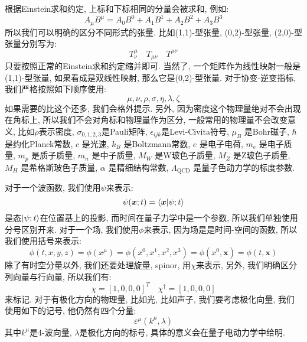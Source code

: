 根据Einstein求和约定, 上标和下标相同的分量会被求和, 例如:
\begin{equation}
  A_\mu B^\mu = A_0 B^0 + A_1 B^1 + A_2 B^2 + A_3 B^3
\end{equation}
所以我们可以明确的区分不同形式的张量.
比如(1,1)-型张量, (0,2)-型张量, (2,0)-型张量分别写为:
\begin{equation}
  T^\mu_\nu \quad T_{\mu\nu} \quad T^{\mu\nu}
\end{equation}
只要按照正常的Einstein求和约定缩并即可.
当然了, 一个矩阵作为线性映射一般是(1,1)-型张量, 如果看成是双线性映射, 那么它是(0,2)-型张量. %
对于协变-逆变指标, 我们严格按照如下顺序使用:
\begin{equation}
  \mu, \nu, \rho, \sigma, \eta, \lambda, \zeta
\end{equation}
如果需要的比这个还多, 我们会格外提示.
另外, 因为密度这个物理量绝对不会出现在角标上, 所以我们不会对角标和物理量作为区分, 一般常用的物理量不会改变意义, 比如$\rho$表示密度, $\sigma_{0,1,2,3}$是Pauli矩阵, $\epsilon_{ijk}$是Levi-Civita符号, $\mu_B$ 是Bohr磁子, $\hbar$ 是约化Planck常数, $c$ 是光速, $k_B$ 是Boltzmann常数, $e$ 是电子电荷, $m_e$ 是电子质量, $m_p$ 是质子质量, $m_n$ 是中子质量, $M_W$ 是W玻色子质量, $M_Z$ 是Z玻色子质量, $M_H$ 是希格斯玻色子质量, $\alpha$ 是精细结构常数, $\Lambda_{\text{QCD}}$ 是量子色动力学的标度参数.


对于一个波函数, 我们使用$\psi$来表示:
\begin{equation}
  \psi(\bm{x}; t) = \braket{\bm{x}}{\psi; t}
\end{equation}
是态$\ket{\psi; t}$在位置基上的投影, 而时间在量子力学中是一个参数, 所以我们单独使用分号区别开来.
对于一个场, 我们使用$\phi$来表示, 因为场是是时间-空间的函数, 所以我们使用括号来表示:
\begin{equation}
  \phi(t, x, y, z) = \phi(x^\mu) = \phi(x^0, x^1, x^2, x^3) = \phi(x^0, \bm{x}) = \phi(t, \bm{x})
\end{equation}
除了有时空分量以外, 我们还要处理旋量, spinor, 用$\chi$来表示, 另外, 我们明确区分列向量与行向量, 所以我们有:
\begin{equation}
  \chi = [1 ,0 ,0 ,0]^T \quad \chi^\dagger = [1 ,0 ,0 ,0]
\end{equation}
来标记.
对于有极化方向的物理量, 比如光, 比如声子, 我们要考虑极化向量, 我们使用如下的记号, 他仍然有四个分量:
\begin{equation}
  \varepsilon^\mu(k^\mu, \lambda)
\end{equation}
其中$k^\mu$是4-波向量, $\lambda$是极化方向的标号, 具体的意义会在量子电动力学中给明.

